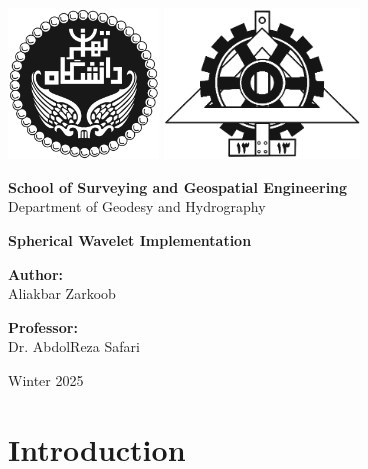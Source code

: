 \documentclass[12pt]{article}
\begin{document}
	
	\begin{titlepage}
		\begin{center}
			
			\includegraphics[height=4cm]{University_of_Tehran_Transparent_BW_logo.png} \hfill
			\includegraphics[height=4cm]{Fanni_Alt_BW_Logo.png}
			
			\vspace{1cm}
			
			\Large \textbf{School of Surveying and Geospatial Engineering}\\
			\large {Department of Geodesy and Hydrography}
			
			\vspace{3cm}
			
			\huge \textbf{Spherical Wavelet Implementation}
			
			\vspace{3cm}
			
			\Large \textbf{Author:}\\
			\Large Aliakbar Zarkoob
			
			\vspace{2cm}
			
			\Large \textbf{Professor:}\\
			Dr. AbdolReza Safari
			
			\vfill
			
			\large {Winter 2025}
			
		\end{center}
	\end{titlepage}
	
	
	\section{Introduction}
	
\end{document}
